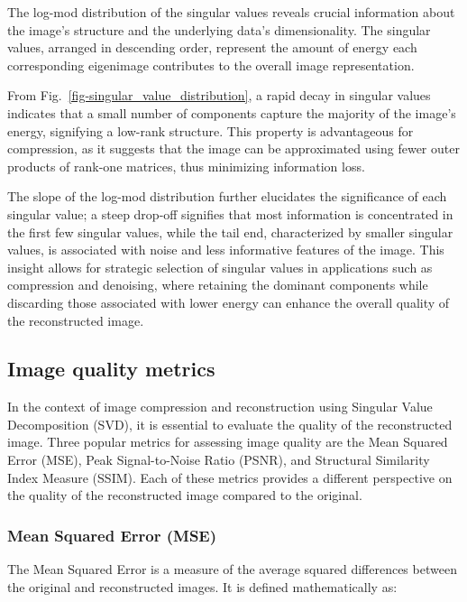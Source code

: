 \documentclass[
  journal,
]{IEEEtran}%
\begin{document}
The log-mod distribution of the singular values reveals crucial
information about the image's structure and the underlying data's
dimensionality. The singular values, arranged in descending order,
represent the amount of energy each corresponding eigenimage contributes
to the overall image representation.

From Fig.~\ref{fig-singular_value_distribution}, a rapid decay in
singular values indicates that a small number of components capture the
majority of the image's energy, signifying a low-rank structure. This
property is advantageous for compression, as it suggests that the image
can be approximated using fewer outer products of rank-one matrices,
thus minimizing information loss.

The slope of the log-mod distribution further elucidates the
significance of each singular value; a steep drop-off signifies that
most information is concentrated in the first few singular values, while
the tail end, characterized by smaller singular values, is associated
with noise and less informative features of the image. This insight
allows for strategic selection of singular values in applications such
as compression and denoising, where retaining the dominant components
while discarding those associated with lower energy can enhance the
overall quality of the reconstructed image.

\subsection{Image quality metrics}\label{image-quality-metrics}

In the context of image compression and reconstruction using Singular
Value Decomposition (SVD), it is essential to evaluate the quality of
the reconstructed image. Three popular metrics for assessing image
quality are the Mean Squared Error (MSE), Peak Signal-to-Noise Ratio
(PSNR), and Structural Similarity Index Measure (SSIM). Each of these
metrics provides a different perspective on the quality of the
reconstructed image compared to the original.

\subsubsection{Mean Squared Error (MSE)}\label{mean-squared-error-mse}

The Mean Squared Error is a measure of the average squared differences
between the original and reconstructed images. It is defined
mathematically as:
\end{document}
